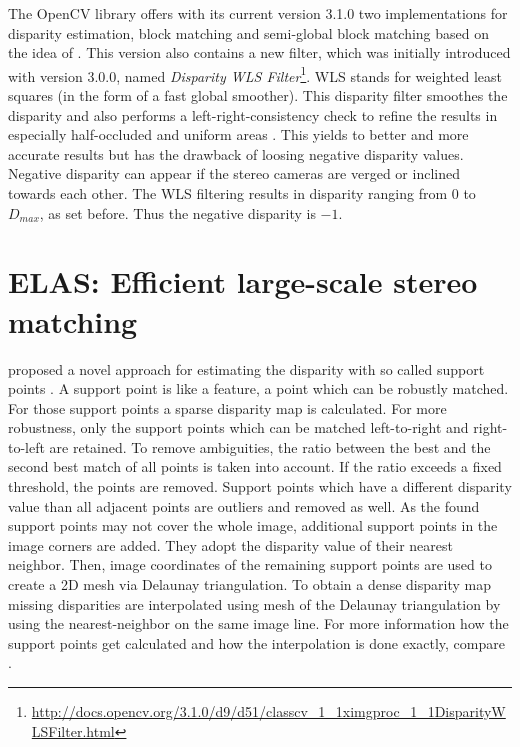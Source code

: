 The OpenCV library \citep{opencv_library} offers with its current version 3.1.0 two implementations for disparity estimation, block matching and semi-global block matching based on the idea of \citeauthor{hirschmuller2005accurate}.
This version also contains a new filter, which was initially introduced with version 3.0.0, named \textit{Disparity WLS Filter}\footnote{\url{http://docs.opencv.org/3.1.0/d9/d51/classcv_1_1ximgproc_1_1DisparityWLSFilter.html}}.
WLS stands for weighted least squares (in the form of a fast global smoother).
This disparity filter smoothes the disparity and also performs a left-right-consistency check to refine the results in especially half-occluded and uniform areas \citep{min2014fast}.
This yields to better and more accurate results but has the drawback of loosing negative disparity values.
Negative disparity can appear if the stereo cameras are verged or inclined towards each other.
The WLS filtering results in disparity ranging from $0$ to $D_{max}$, as set before.
Thus the negative disparity is $-1$.

\section{ELAS: Efficient large-scale stereo matching}

\citeauthor{Geiger2010ACCV} proposed a novel approach for estimating the disparity with so called support points \citep{Geiger2010ACCV, Geiger2011IV}.
A support point is like a feature, a point which can be robustly matched.
For those support points a sparse disparity map is calculated.
For more robustness, only the support points which can be matched left-to-right and right-to-left are retained.
To remove ambiguities, the ratio between the best and the second best match of all points is taken into account.
If the ratio exceeds a fixed threshold, the points are removed.
Support points which have a different disparity value than all adjacent points are outliers and removed as well.
As the found support points may not cover the whole image, additional support points in the image corners are added.
They adopt the disparity value of their nearest neighbor.
Then, image coordinates of the remaining support points are used to create a 2D mesh via Delaunay triangulation.
To obtain a dense disparity map missing disparities are interpolated using mesh of the Delaunay triangulation by using the nearest-neighbor on the same image line.
For more information how the support points get calculated and how the interpolation is done exactly, compare \citep{Geiger2010ACCV, Geiger2011IV}.

